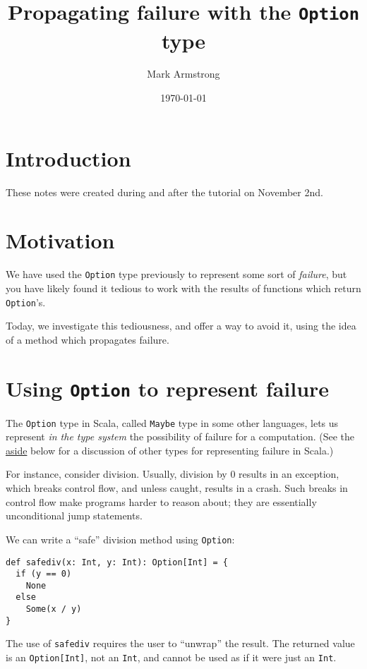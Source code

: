 \documentclass[11pt]{article}
\author{Mark Armstrong}
\date{\today}
\title{Propagating failure with the \texttt{Option} type}
\begin{document}
\maketitle
\tableofcontents


\section{Introduction}
\label{sec:org3d6d534}
These notes were created during and after
the tutorial on November 2nd.

\section{Motivation}
\label{sec:orgc1249f2}
We have used the \texttt{Option} type previously to represent
some sort of \emph{failure}, but you have likely found
it tedious to work with the results of functions
which return \texttt{Option}'s.

Today, we investigate this tediousness,
and offer a way to avoid it,
using the idea of a method which propagates failure.

\section{Using \texttt{Option} to represent failure}
\label{sec:org1f58244}
The \texttt{Option} type in Scala, called \texttt{Maybe} type in some other languages,
lets us represent \emph{in the type system} the possibility of failure
for a computation.
(See the \hyperref[sec:orga0c6232]{aside} below for a discussion
 of other types for representing failure in Scala.)

For instance, consider division. Usually, division by 0 results
in an exception, which breaks control flow, and unless caught,
results in a crash. Such breaks in control flow make programs
harder to reason about; they are essentially unconditional jump statements.

We can write a “safe” division method using \texttt{Option}:
\begin{verbatim}
def safediv(x: Int, y: Int): Option[Int] = {
  if (y == 0)
    None
  else
    Some(x / y)
}
\end{verbatim}
The use of \texttt{safediv} requires the user to “unwrap” the result.
The returned value is an \texttt{Option[Int]}, not an \texttt{Int},
and cannot be used as if it were just an \texttt{Int}.
\end{document}
